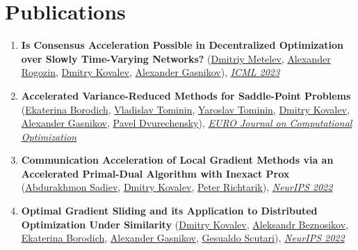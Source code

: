 \section{Publications}
\begin{enumerate}
\item \textbf{Is Consensus Acceleration Possible in Decentralized Optimization over Slowly Time-Varying Networks?} (\href{}{\color{linkcolour}Dmitriy Metelev}, \href{https://scholar.google.com/citations?user=sEjyzkgAAAAJ}{\color{linkcolour}Alexander Rogozin}, \href{https://www.dmitry-kovalev.com}{\color{linkcolour}Dmitry Kovalev}, \href{https://scholar.google.ru/citations?user=AmeE8qkAAAAJ}{\color{linkcolour}Alexander Gasnikov}), \href{https://openreview.net/forum?id=DwDQNKF4oy}{\em \color{black}ICML 2023}
\item \textbf{Accelerated Variance-Reduced Methods for Saddle-Point Problems} (\href{https://scholar.google.com/citations?user=9Dapoy8AAAAJ}{\color{linkcolour}Ekaterina Borodich}, \href{}{\color{linkcolour}Vladislav Tominin}, \href{}{\color{linkcolour}Yaroslav Tominin}, \href{https://www.dmitry-kovalev.com}{\color{linkcolour}Dmitry Kovalev}, \href{https://scholar.google.ru/citations?user=AmeE8qkAAAAJ}{\color{linkcolour}Alexander Gasnikov}, \href{http://wias-berlin.de/people/dvureche/}{\color{linkcolour}Pavel Dvurechensky}), \href{https://www.sciencedirect.com/science/article/pii/S2192440622000247}{\em \color{black}EURO Journal on Computational Optimization}
\item \textbf{Communication Acceleration of Local Gradient Methods via an Accelerated Primal-Dual Algorithm with Inexact Prox} (\href{https://scholar.google.com/citations?user=R-xZRIAAAAAJ&hl=ru}{\color{linkcolour}Abdurakhmon Sadiev}, \href{https://www.dmitry-kovalev.com}{\color{linkcolour}Dmitry Kovalev}, \href{https://richtarik.org}{\color{linkcolour}Peter Richtarik}), \href{https://papers.nips.cc/paper_files/paper/2022/hash/88c3c482430a62d35e03926a22e4b67e-Abstract-Conference.html}{\em \color{black}NeurIPS 2022}
\item \textbf{Optimal Gradient Sliding and its Application to Distributed Optimization Under Similarity} (\href{https://www.dmitry-kovalev.com}{\color{linkcolour}Dmitry Kovalev}, \href{https://anbeznosikov.github.io}{\color{linkcolour}Aleksandr Beznosikov}, \href{https://scholar.google.com/citations?user=9Dapoy8AAAAJ}{\color{linkcolour}Ekaterina Borodich}, \href{https://scholar.google.ru/citations?user=AmeE8qkAAAAJ}{\color{linkcolour}Alexander Gasnikov}, \href{https://engineering.purdue.edu/~gscutari/}{\color{linkcolour}Gesualdo Scutari}), \href{https://proceedings.neurips.cc/paper_files/paper/2022/hash/d88f6f81e1aaf606776ffdd06fdf24ef-Abstract-Conference.html}{\em \color{black}NeurIPS 2022}

\end{enumerate}
